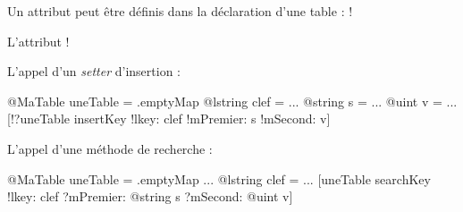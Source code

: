 
Un attribut peut être définis dans la déclaration d'une table : \ggs!%

L'attribut \ggs!%



L'appel d'un \emph{setter} d'insertion :
\begin{galgas}
@MaTable uneTable = .emptyMap
@lstring clef = ...
@string s = ...
@uint v = ...
[!?uneTable insertKey !lkey: clef !mPremier: s !mSecond: v]
\end{galgas}



L'appel d'une méthode de recherche :
\begin{galgas}
@MaTable uneTable = .emptyMap
...
@lstring clef = ...
[uneTable searchKey !lkey: clef ?mPremier: @string s ?mSecond: @uint v]
\end{galgas}

%
%




%





